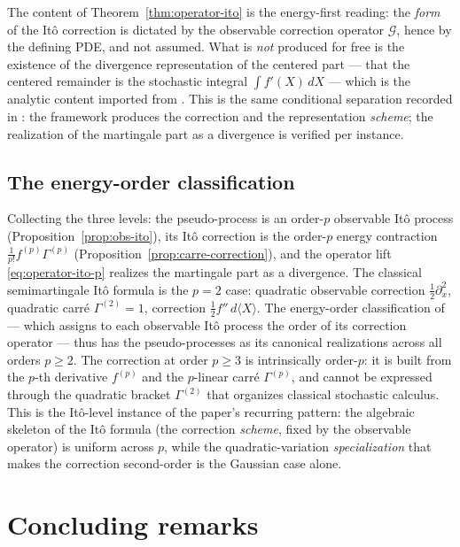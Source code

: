 \documentclass[11pt,reqno]{amsart}
\theoremstyle{plain}
\theoremstyle{definition}
\begin{document}
The content of Theorem~\ref{thm:operator-ito} is the energy-first reading: the \emph{form} of the It\^o correction is dictated by the observable correction operator $\mathcal G$, hence by the defining PDE, and not assumed. What is \emph{not} produced for free is the existence of the divergence representation of the centered part --- that the centered remainder is the stochastic integral $\int f'(X)\,dX$ --- which is the analytic content imported from \cite{NishiokaBiharmonic, LachalAiry}. This is the same conditional separation recorded in \cite[Rem.~2.7]{operatorDerivativeI}: the framework produces the correction and the representation \emph{scheme}; the realization of the martingale part as a divergence is verified per instance.

\subsection{The energy-order classification}

Collecting the three levels: the pseudo-process is an order-$p$ observable It\^o process (Proposition~\ref{prop:obs-ito}), its It\^o correction is the order-$p$ energy contraction $\tfrac{1}{p!}f^{(p)}\Gamma^{(p)}$ (Proposition~\ref{prop:carre-correction}), and the operator lift \eqref{eq:operator-ito-p} realizes the martingale part as a divergence. The classical semimartingale It\^o formula is the $p=2$ case: quadratic observable correction $\tfrac12\partial_x^2$, quadratic carr\'e $\Gamma^{(2)} = 1$, correction $\tfrac12 f''\,d\langle X\rangle$. The energy-order classification of \cite{operatorDerivativeI} --- which assigns to each observable It\^o process the order of its correction operator --- thus has the pseudo-processes as its canonical realizations across all orders $p \geq 2$. The correction at order $p \geq 3$ is intrinsically order-$p$: it is built from the $p$-th derivative $f^{(p)}$ and the $p$-linear carr\'e $\Gamma^{(p)}$, and cannot be expressed through the quadratic bracket $\Gamma^{(2)}$ that organizes classical stochastic calculus. This is the It\^o-level instance of the paper's recurring pattern: the algebraic skeleton of the It\^o formula (the correction \emph{scheme}, fixed by the observable operator) is uniform across $p$, while the quadratic-variation \emph{specialization} that makes the correction second-order is the Gaussian case alone.

\section{Concluding remarks}
\end{document}
